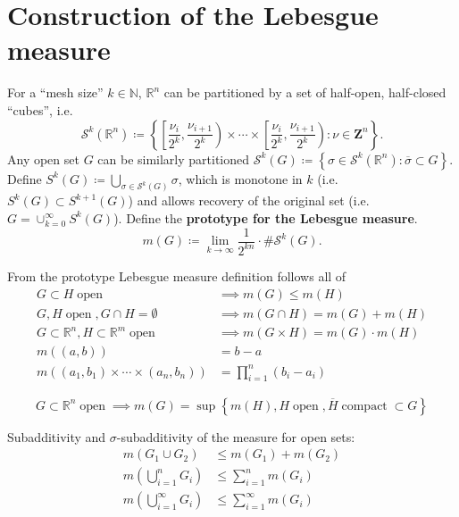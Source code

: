 \documentclass[letterpaper,11pt,intlimits,sumlimits]{amsart}
\newcommand{\closure}[1]{\overline{#1}}
\newcommand{\naturals}{\mathbb{N}}
\newcommand{\reals}{\mathbb{R}}
\newcommand{\keyphrase}[1]{\textbf{#1}}
\DeclareMathOperator{\open}{open}
\DeclareMathOperator{\compact}{compact}
\begin{document}
\section*{Construction of the Lebesgue measure}

For a ``mesh size'' $k\in\naturals$, $\reals^{n}$ can be partitioned by a set
of half-open, half-closed ``cubes'', i.e.
\[
\mathcal{S}^{k}\left(\reals^{n}\right) \coloneqq \left\{
    \left[\frac{\nu_{i}}{2^{k}},\frac{\nu_{i+1}}{2^{k}}\right)
    \times \cdots \times
    \left[\frac{\nu_{i}}{2^{k}},\frac{\nu_{i+1}}{2^{k}}\right)
    : \nu\in\mathbf{Z}^{n}
\right\}.
\]
Any open set $G$ can be similarly partitioned
\mbox{$\mathcal{S}^{k}\left( G \right) \coloneqq \left\{
\sigma\in\mathcal{S}^{k}\left( \reals^{n} \right):\closure{\sigma}\subset{}G
\right\}$}.
Define
\mbox{$S^{k}\left( G \right) \coloneqq
\bigcup\limits_{\sigma\in\mathcal{S}^{k}\left( G \right)}\sigma$}, which is
monotone in $k$ (i.e. \mbox{
$S^{k}\left( G \right)\subset{}S^{k+1}\left( G \right)$}) and allows
recovery of the original set (i.e.
\mbox{$G = \cup_{k=0}^{\infty} S^{k}\left( G \right)$}). Define the
\keyphrase{prototype for the Lebesgue measure}.
\[
m(G) \coloneqq
\lim_{k\to\infty} \frac{1}{2^{kn}} \cdot \#\mathcal{S}^{k}\left( G \right).
\]

From the prototype Lebesgue measure definition follows all of
\begin{align*}
    G\subset{}H \open &\implies m(G) \leq m(H)
    \tag{i} \\
    G,H \open,G\cap{}H = \emptyset &\implies m(G\cap{}H) = m(G)+m(H)
    \tag{ii} \\
    G\subset\reals^{n}, H\subset\reals^{m} \open &\implies
    m(G\times{}H) = m(G)\cdot{}m(H)
    \tag{iii} \\
    m\left( (a,b) \right) &= b - a
    \tag{iv} \\
    m\left( (a_{1},b_{1}) \times\cdots\times (a_{n},b_{n}) \right)
    &= \prod_{i=1}^{n} (b_{i} - a_{i})
    \tag{v}
\end{align*}

\[
    G\subset\reals^{n} \open \implies m(G) = \sup \left\{
        m(H), H \open, \closure{H} \compact \subset G
    \right\}
\]

Subadditivity and $\sigma$-subadditivity of the measure for open sets:
\begin{align*}
    m\left( G_{1}\cup{}G_{2} \right) &\leq m(G_{1}) + m(G_{2})
    \tag{i} \\
    m\left(\bigcup_{i=1}^{n} G_{i}\right)
    &\leq
    \sum_{i=1}^{n}m\left(G_{i}\right)
    \tag{ii} \\
    m\left(\bigcup_{i=1}^{\infty}G_{i}\right)
    &\leq
    \sum_{i=1}^{\infty}m\left(G_{i}\right)
    \tag{iii}
\end{align*}
\end{document}
